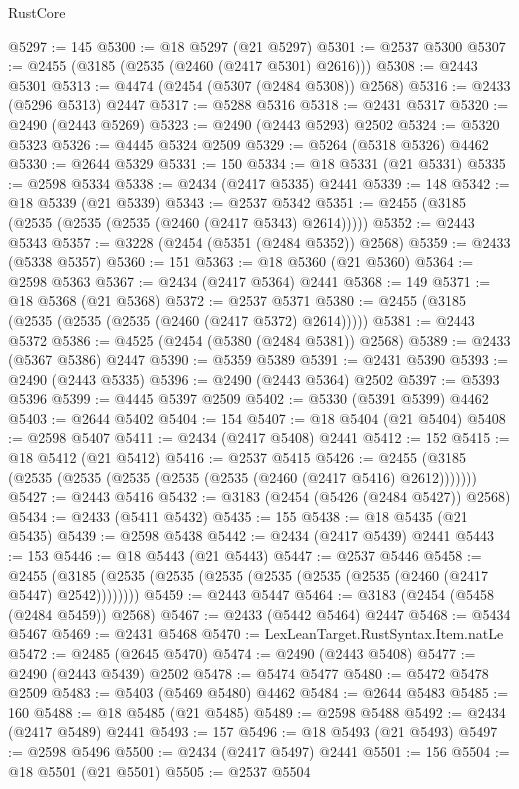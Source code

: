 \begin{lexlean}{RustCore}
\begin{coremodule}
@5297 := 145
@5300 := @18 @5297 (@21 @5297)
@5301 := @2537 @5300
@5307 := @2455 (@3185 (@2535 (@2460 (@2417 @5301) @2616)))
@5308 := @2443 @5301
@5313 := @4474 (@2454 (@5307 (@2484 @5308)) @2568)
@5316 := @2433 (@5296 @5313) @2447
@5317 := @5288 @5316
@5318 := @2431 @5317
@5320 := @2490 (@2443 @5269)
@5323 := @2490 (@2443 @5293) @2502
@5324 := @5320 @5323
@5326 := @4445 @5324 @2509
@5329 := @5264 (@5318 @5326) @4462
@5330 := @2644 @5329
@5331 := 150
@5334 := @18 @5331 (@21 @5331)
@5335 := @2598 @5334
@5338 := @2434 (@2417 @5335) @2441
@5339 := 148
@5342 := @18 @5339 (@21 @5339)
@5343 := @2537 @5342
@5351 := @2455 (@3185 (@2535 (@2535 (@2535 (@2460 (@2417 @5343) @2614)))))
@5352 := @2443 @5343
@5357 := @3228 (@2454 (@5351 (@2484 @5352)) @2568)
@5359 := @2433 (@5338 @5357)
@5360 := 151
@5363 := @18 @5360 (@21 @5360)
@5364 := @2598 @5363
@5367 := @2434 (@2417 @5364) @2441
@5368 := 149
@5371 := @18 @5368 (@21 @5368)
@5372 := @2537 @5371
@5380 := @2455 (@3185 (@2535 (@2535 (@2535 (@2460 (@2417 @5372) @2614)))))
@5381 := @2443 @5372
@5386 := @4525 (@2454 (@5380 (@2484 @5381)) @2568)
@5389 := @2433 (@5367 @5386) @2447
@5390 := @5359 @5389
@5391 := @2431 @5390
@5393 := @2490 (@2443 @5335)
@5396 := @2490 (@2443 @5364) @2502
@5397 := @5393 @5396
@5399 := @4445 @5397 @2509
@5402 := @5330 (@5391 @5399) @4462
@5403 := @2644 @5402
@5404 := 154
@5407 := @18 @5404 (@21 @5404)
@5408 := @2598 @5407
@5411 := @2434 (@2417 @5408) @2441
@5412 := 152
@5415 := @18 @5412 (@21 @5412)
@5416 := @2537 @5415
@5426 := @2455 (@3185 (@2535 (@2535 (@2535 (@2535 (@2535 (@2460 (@2417 @5416) @2612)))))))
@5427 := @2443 @5416
@5432 := @3183 (@2454 (@5426 (@2484 @5427)) @2568)
@5434 := @2433 (@5411 @5432)
@5435 := 155
@5438 := @18 @5435 (@21 @5435)
@5439 := @2598 @5438
@5442 := @2434 (@2417 @5439) @2441
@5443 := 153
@5446 := @18 @5443 (@21 @5443)
@5447 := @2537 @5446
@5458 := @2455 (@3185 (@2535 (@2535 (@2535 (@2535 (@2535 (@2535 (@2460 (@2417 @5447) @2542))))))))
@5459 := @2443 @5447
@5464 := @3183 (@2454 (@5458 (@2484 @5459)) @2568)
@5467 := @2433 (@5442 @5464) @2447
@5468 := @5434 @5467
@5469 := @2431 @5468
@5470 := LexLeanTarget.RustSyntax.Item.natLe
@5472 := @2485 (@2645 @5470)
@5474 := @2490 (@2443 @5408)
@5477 := @2490 (@2443 @5439) @2502
@5478 := @5474 @5477
@5480 := @5472 @5478 @2509
@5483 := @5403 (@5469 @5480) @4462
@5484 := @2644 @5483
@5485 := 160
@5488 := @18 @5485 (@21 @5485)
@5489 := @2598 @5488
@5492 := @2434 (@2417 @5489) @2441
@5493 := 157
@5496 := @18 @5493 (@21 @5493)
@5497 := @2598 @5496
@5500 := @2434 (@2417 @5497) @2441
@5501 := 156
@5504 := @18 @5501 (@21 @5501)
@5505 := @2537 @5504

\end{coremodule}
\end{lexlean}
